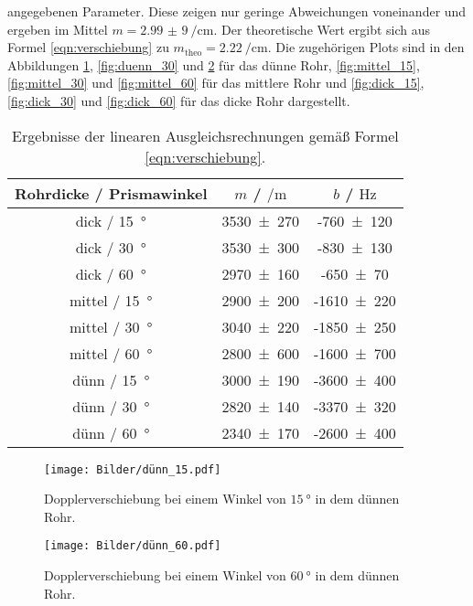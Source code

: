 angegebenen Parameter.
Diese zeigen nur geringe Abweichungen voneinander und ergeben im
Mittel $m = \SI{2,99(9)}{\per\centi\meter}$. Der theoretische Wert ergibt sich aus Formel
\eqref{eqn:verschiebung} zu $m_{\mathrm{theo}} = \SI{2,22}{\per\centi\meter}$.
Die zugehörigen Plots sind in den Abbildungen \ref{fig:duenn_15}, \ref{fig:duenn_30} und
\ref{fig:duenn_60} für das dünne Rohr, \ref{fig:mittel_15}, \ref{fig:mittel_30} und
\ref{fig:mittel_60} für das mittlere Rohr und \ref{fig:dick_15}, \ref{fig:dick_30} und
\ref{fig:dick_60} für das dicke Rohr dargestellt.
\begin{table}
	\centering
	\caption{Ergebnisse der linearen Ausgleichsrechnungen gemäß Formel \eqref{eqn:verschiebung}.}
	\label{tab:fitcoeff}
	\begin{tabular}{ccc}
		\toprule
		Rohrdicke / Prismawinkel & $m$ / $\si{\per\meter}$ & $b$ / $\si{\hertz}$ \\
		\midrule
		dick / \SI{15}{\degree} & \num{3530(270)} & -\num{760(120)} \\
		dick / \SI{30}{\degree} & \num{3530(300)} & -\num{830(130)} \\
		dick / \SI{60}{\degree} & \num{2970(160)} & -\num{650(70)} \\
		mittel / \SI{15}{\degree} & \num{2900(200)} & -\num{1610(220)} \\
		mittel / \SI{30}{\degree} & \num{3040(220)} & -\num{1850(250)} \\
		mittel / \SI{60}{\degree} & \num{2800(600)} & -\num{1600(700)} \\
		dünn / \SI{15}{\degree} & \num{3000(190)} & -\num{3600(400)} \\
		dünn / \SI{30}{\degree} & \num{2820(140)} & -\num{3370(320)} \\
		dünn / \SI{60}{\degree} & \num{2340(170)} & -\num{2600(400)} \\
		\bottomrule
	\end{tabular}
\end{table}
\begin{figure}
	 \centering
	  \caption{Dopplerverschiebung bei einem Winkel von $\SI{15}{\degree}$ in dem dünnen Rohr.}
	   \texttt{[image: Bilder/dünn\_15.pdf]}
	    \label{fig:duenn_15}
\end{figure}

\begin{figure}
	 \centering
	  \caption{Dopplerverschiebung bei einem Winkel von $\SI{60}{\degree}$ in dem dünnen Rohr.}
	   \texttt{[image: Bilder/dünn\_60.pdf]}
	    \label{fig:duenn_60}
\end{figure}

